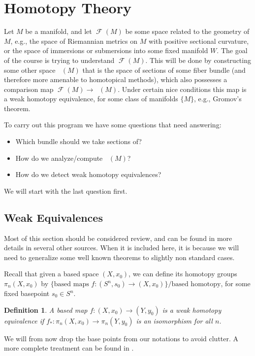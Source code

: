 \documentclass{article}
\newtheorem{definition}[theorem]{Definition}
\newtheorem{proposed work}[theorem]{Proposed Work}
\DeclareMathOperator{\CF}{\mathcal F}
\DeclareMathOperator{\CFh}{\mathcal{F}^{h}} %
\begin{document}
\section{Homotopy Theory}
Let $M$ be a manifold, and let $\CF(M)$ be some space related to the geometry of $M$, e.g., the space of Riemannian metrics on $M$ with positive sectional curvature, or the space of immersions or submersions into some fixed manifold $W$. The goal of the course is trying to understand $\CF(M)$. This will be done by constructing some other space $\CFh(M)$ that is the space of sections of some fiber bundle (and therefore more amenable to homotopical methods), which also possesses a comparison map $\CF(M)\to \CFh(M)$. Under certain nice conditions this map is a weak homotopy equivalence, for some class of manifolds $\{M\}$, e.g., Gromov's theorem.

To carry out this program we have some questions that need answering:
\begin{itemize}
\item Which bundle should we take sections of?
\item How do we analyze/compute $\CFh(M)$?
\item How do we detect weak homotopy equivalences? 
\end{itemize} 
We will start with the last question first.

\subsection{Weak Equivalences}
Most of this section should be considered review, and can be found in more details in several other sources. When it is included here, it is because we will need to generalize some well known theorems to slightly non standard cases.

Recall that given a based space $(X,x_0)$, we can define its homotopy groups $\pi_n(X,x_0)$ by $\{\text{based maps }f:(S^n,s_0)\to (X,x_0)\}/\text{based homotopy}$, for some fixed basepoint $s_0\in S^n$. 
\begin{definition}
A based map $f:(X,x_0)\to (Y,y_0)$ is a weak homotopy equivalence if $f_*:\pi_n(X,x_0)\to \pi_n(Y,y_0)$ is an isomorphism for all $n$.
\end{definition}
We will from now drop the base points from our notations to avoid clutter. A more complete treatment can be found in \cite{may1999concise}.
\end{document}

